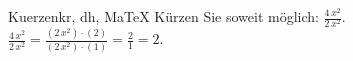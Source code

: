\begin{MAufgabe}{Kuerzen}{kr, dh, MaTeX}
K\"urzen Sie soweit m\"oglich: $\frac{4\, x^2}{2\, x^2}$.\\ 
\ifLsg\MLoesung
\quad $\frac{4\, x^2}{2\, x^2}=\frac{(2\, x^2)\cdot(2)}{(2\, x^2)\cdot(1)}=\frac{2}{1}=2$.\else\relax\fi
 \end{MAufgabe}